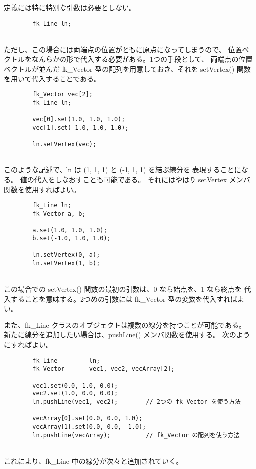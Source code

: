 定義には特に特別な引数は必要としない。
\\
\begin{screen}
\begin{verbatim}
        fk_Line ln;
\end{verbatim}
\end{screen}
~ \\
ただし、この場合には両端点の位置がともに原点になってしまうので、
位置ベクトルをなんらかの形で代入する必要がある。1つの手段として、
両端点の位置ベクトルが並んだ fk\_Vector 型の配列を用意しておき、それを
setVertex() 関数を用いて代入することである。
\\
\begin{breakbox}
\begin{verbatim}
        fk_Vector vec[2];
        fk_Line ln;

        vec[0].set(1.0, 1.0, 1.0);
        vec[1].set(-1.0, 1.0, 1.0);

        ln.setVertex(vec);
\end{verbatim}
\end{breakbox}
~ \\
このような記述で、ln は (1, 1, 1) と (-1, 1, 1) を結ぶ線分を
表現することになる。
値の代入をしなおすことも可能である。
それにはやはり setVertex メンバ関数を使用すればよい。
\\
\begin{breakbox}
\begin{verbatim}
        fk_Line ln;
        fk_Vector a, b;

        a.set(1.0, 1.0, 1.0);
        b.set(-1.0, 1.0, 1.0);

        ln.setVertex(0, a);
        ln.setVertex(1, b);
\end{verbatim}
\end{breakbox}
~ \\
この場合での setVertex() 関数の最初の引数は、0 なら始点を、1 なら終点を
代入することを意味する。2つめの引数には fk\_Vector 型の変数を代入すればよい。

また、fk\_Line クラスのオブジェクトは複数の線分を持つことが可能である。
新たに線分を追加したい場合は、pushLine() メンバ関数を使用する。
次のようにすればよい。
\\
\begin{breakbox}
\begin{verbatim}
        fk_Line         ln;
        fk_Vector       vec1, vec2, vecArray[2];

        vec1.set(0.0, 1.0, 0.0);
        vec2.set(1.0, 0.0, 0.0);
        ln.pushLine(vec1, vec2);        // 2つの fk_Vector を使う方法

        vecArray[0].set(0.0, 0.0, 1.0);
        vecArray[1].set(0.0, 0.0, -1.0);
        ln.pushLine(vecArray);          // fk_Vector の配列を使う方法
\end{verbatim}
\end{breakbox}
~ \\
これにより、fk\_Line 中の線分が次々と追加されていく。

